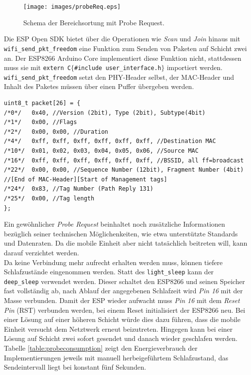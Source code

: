 \begin{figure}[h]
  \centering
	\texttt{[image: images/probeReq.eps]}
  \caption{Schema der Bereichsortung mit Probe Request.}
  \label{fig:probeReq}
\end{figure}


Die ESP Open SDK bietet über die Operationen wie \emph{Scan} und \emph{Join} hinaus mit \texttt{wifi\_send\_pkt\_freedom} eine Funktion zum Senden von Paketen auf Schicht zwei an.
Der ESP8266 Arduino Core implementiert diese Funktion nicht, stattdessen muss sie mit \texttt{extern \dq C\dq $\lbrace$\#include \dq user\_interface.h\dq $\rbrace$} importiert werden. \\
\texttt{wifi\_send\_pkt\_freedom} setzt den PHY-Header selbst, der MAC-Header und Inhalt des Paketes müssen über einen Puffer übergeben werden.
\begin{verbatim}
uint8_t packet[26] = { 
/*0*/ 	0x40, //Version (2bit), Type (2bit), Subtype(4bit)
/*1*/ 	0x00, //Flags 
/*2*/ 	0x00, 0x00, //Duration
/*4*/   0xff, 0xff, 0xff, 0xff, 0xff, 0xff, //Destination MAC
/*10*/  0x01, 0x02, 0x03, 0x04, 0x05, 0x06, //Source MAC
/*16*/  0xff, 0xff, 0xff, 0xff, 0xff, 0xff, //BSSID, all ff=broadcast
/*22*/  0x00, 0x00, //Sequence Number (12bit), Fragment Number (4bit) 
//[End of MAC-Header][Start of Management tags]
/*24*/  0x83, //Tag Number (Path Reply 131) 
/*25*/ 	0x00, //Tag length
}; 
\end{verbatim}
Ein gewöhnlicher \emph{Probe Request} beinhaltet noch zusätzliche Informationen bezüglich seiner technischen Möglichenkeiten, wie etwa unterstützte Standards und Datenraten. 
Da die mobile Einheit aber nicht tatsächlich beitreten will, kann darauf verzichtet werden. \\
Da keine Verbindung mehr aufrecht erhalten werden muss, können tiefere Schlafzustände eingenommen werden. 
Statt des \texttt{light\_sleep} kann der \texttt{deep\_sleep} verwendet werden.
Dieser schaltet den ESP8266 und seinen Speicher fast vollständig ab, nach Ablauf der angegebenen Schlafzeit wird \emph{Pin 16} mit der Masse verbunden.
Damit der ESP wieder aufwacht muss \emph{Pin 16} mit dem \emph{Reset Pin} (RST) verbunden werden, bei einem Reset initialisiert der ESP8266 neu.
Bei einer Lösung auf einer höheren Schicht würde dies dazu führen, dass die mobile Einheit versucht dem Netztwerk erneut beizutreten. 
Hingegen kann bei einer Lösung auf Schicht zwei sofort gesendet und danach wieder geschlafen werden.\\
Tabelle \ref{table:probeconsumption} zeigt den Energieverbrauch der Implementierungen jeweils mit manuell herbeigeführtem Schlafzustand, das Sendeintervall liegt bei konstant fünf Sekunden.
